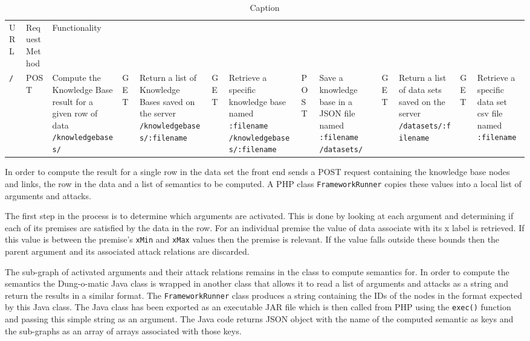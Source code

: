 \begin{table}[]
\centering
\begin{tabular}{|l|l|L{5cm}|}
 URL & Request Method & Functionality \hline \\
 \lstinline{/} & POST & Compute the Knowledge Base result for a given row of data
 \lstinline{/knowledgebases/} & GET & Return a list of Knowledge Bases saved on the server
 \lstinline{/knowledgebases/:filename} & GET & Retrieve a specific knowledge base named \lstinline{:filename}
 \lstinline{/knowledgebases/:filename} & POST & Save a knowledge base in a JSON file named \lstinline{:filename}
 \lstinline{/datasets/} & GET & Return a list of data sets saved on the server
 \lstinline{/datasets/:filename} & GET & Retrieve a specific data set csv file named \lstinline{:filename}
\end{tabular}
\caption{Caption}
\label{tab:rest_routes}
\end{table}

In order to compute the result for a single row in the data set the front end sends a POST request containing the knowledge base nodes and links, the row in the data and a list of semantics to be computed. A PHP class \lstinline{FrameworkRunner} copies these values into a local list of arguments and attacks.

The first step in the process is to determine which arguments are activated. This is done by looking at each argument and determining if each of its premises are satisfied by the data in the row. For an individual premise the value of data associate with its x label is retrieved. If this value is between the premise's \lstinline{xMin} and \lstinline{xMax} values then the premise is relevant. If the value falls outside these bounds then the parent argument and its associated attack relations are discarded. 

The sub-graph of activated arguments and their attack relations remains in the class to compute semantics for. In order to compute the semantics the Dung-o-matic Java class is wrapped in another class that allows it to read a list of arguments and attacks as a string and return the results in a similar format. The \lstinline{FrameworkRunner} class produces a string containing the IDs of the nodes in the format expected by this Java class. The Java class has been exported as an executable JAR file which is then called from PHP using the \lstinline{exec()} function and passing this simple string as an argument. The Java code returns JSON object with the name of the computed semantic as keys and the sub-graphs as an array of arrays associated with those keys.


